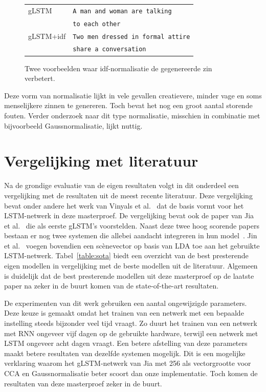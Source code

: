 \begin{figure}
\begin{minipage}[t]{.3\textwidth}
	\end{minipage}\hfill
	\begin{minipage}[t]{.7\textwidth}
		\vspace{0pt}
		\begin{tabular}{ll}
			gLSTM & \texttt{A man and woman are talking} \\ 
			~ & \texttt{to each other} \\
			gLSTM+idf & \texttt{Two men dressed in formal attire}\\
			~ & \texttt{share a conversation} \\
		\end{tabular}
	\end{minipage}
	\caption{Twee voorbeelden waar idf-normalisatie de gegenereerde zin verbetert.}
	\label{fig:betteridf}
\end{figure}

Deze vorm van normalisatie lijkt in vele gevallen creatievere, minder vage en soms menselijkere zinnen te genereren. Toch bevat het nog een groot aantal storende fouten. Verder onderzoek naar dit type normalisatie, misschien in combinatie met bijvoorbeeld Gaussnormalisatie, lijkt nuttig. 

\section{Vergelijking met literatuur} %
\label{sec:vergelijking_met_literatuur}
Na de grondige evaluatie van de eigen resultaten volgt in dit onderdeel een vergelijking met de resultaten uit de meest recente literatuur.
Deze vergelijking bevat onder andere het werk van Vinyals et al.~\cite{Google} dat de basis vormt voor het LSTM-netwerk in deze masterproef. 
De vergelijking bevat ook de paper van Jia et al.~\cite{Fernando2015} die als eerste gLSTM's voorstelden.
Naast deze twee hoog scorende papers bestaan er nog twee systemen die allebei aandacht integreren in hun model~\cite{Jin2015,Xu2015}.
Jin et al.~\cite{Jin2015} voegen bovendien een sc\`enevector op basis van LDA toe aan het gebruikte LSTM-netwerk.
Tabel~\ref{table:sota} biedt een overzicht van de best presterende eigen modellen in vergelijking met de beste modellen uit de literatuur.
Algemeen is duidelijk dat de best presterende modellen uit deze masterproef op de laatste paper na zeker in de buurt komen van de state-of-the-art resultaten.

De experimenten van dit werk gebruiken een aantal ongewijzigde parameters.
Deze keuze is gemaakt omdat het trainen van een netwerk met een bepaalde instelling steeds bijzonder veel tijd vraagt.
Zo duurt het trainen van een netwerk met RNN ongeveer vijf dagen op de gebruikte hardware, terwijl een netwerk met LSTM ongeveer acht dagen vraagt.
Een betere afstelling van deze parameters maakt betere resultaten van dezelfde systemen mogelijk.
Dit is een mogelijke verklaring waarom het gLSTM-netwerk van Jia met 256 als vectorgrootte voor CCA en Gaussnormalisatie beter scoort dan onze implementatie.
Toch komen de resultaten van deze masterproef zeker in de buurt.

